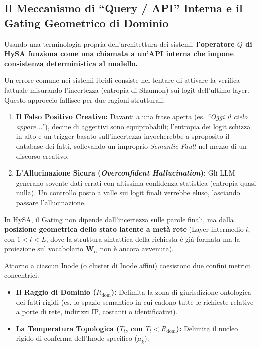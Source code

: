 \documentclass[11pt,a4paper]{article}
\theoremstyle{definition}
\begin{document}
\subsection{Il Meccanismo di ``Query / API'' Interna e il Gating Geometrico di Dominio}

Usando una terminologia propria dell'architettura dei sistemi, \textbf{l'operatore $Q$ di HySA funziona come una chiamata a un'API interna che impone consistenza deterministica al modello.}

Un errore comune nei sistemi ibridi consiste nel tentare di attivare la verifica fattuale misurando l'incertezza (entropia di Shannon) sui logit dell'ultimo layer. Questo approccio fallisce per due ragioni strutturali:
\begin{enumerate}[leftmargin=*, itemsep=2.0pt]
    \item \textbf{Il Falso Positivo Creativo:} Davanti a una frase aperta (es. \textit{``Oggi il cielo appare...''}), decine di aggettivi sono equiprobabili; l'entropia dei logit schizza in alto e un trigger basato sull'incertezza invocherebbe a sproposito il database dei fatti, sollevando un improprio \textit{Semantic Fault} nel mezzo di un discorso creativo.
    \item \textbf{L'Allucinazione Sicura (\textit{Overconfident Hallucination}):} Gli LLM generano sovente dati errati con altissima confidenza statistica (entropia quasi nulla). Un controllo posto a valle sui logit finali verrebbe eluso, lasciando passare l'allucinazione.
\end{enumerate}

In HySA, il Gating non dipende dall'incertezza sulle parole finali, ma dalla \textbf{posizione geometrica dello stato latente a metà rete} (Layer intermedio $l$, con $1 < l < L$, dove la struttura sintattica della richiesta è già formata ma la proiezione sul vocabolario $\mathbf{W}_U$ non è ancora avvenuta).

Attorno a ciascun Inode (o cluster di Inode affini) coesistono due confini metrici concentrici:
\begin{itemize}[leftmargin=*, itemsep=2.0pt]
    \item \textbf{Il Raggio di Dominio ($R_{\mathrm{dom}}$):} Delimita la zona di giurisdizione ontologica dei fatti rigidi (es. lo spazio semantico in cui cadono tutte le richieste relative a porte di rete, indirizzi IP, costanti o identificativi).
    \item \textbf{La Temperatura Topologica ($T_t$, con $T_t < R_{\mathrm{dom}}$):} Delimita il nucleo rigido di conferma dell'Inode specifico ($\mu_k$).
\end{itemize}
\end{document}
